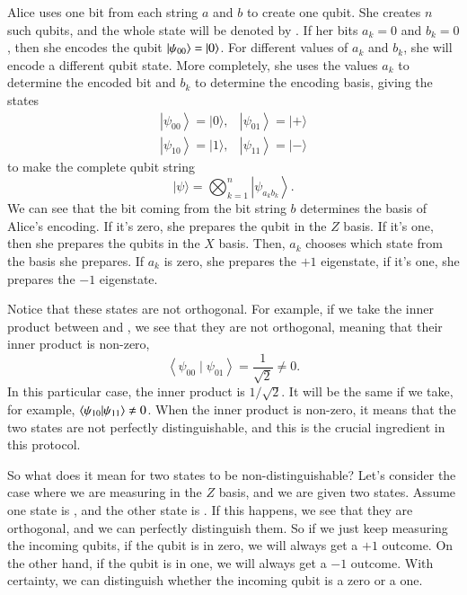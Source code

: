 Alice uses one bit from each string $a$ and $b$ to create one qubit. She creates $n$ such qubits, and the whole state will be denoted by \ket{\psi}. If her bits $a_k = 0$ and $b_k = 0$, then she encodes the qubit $\left| \psi_{00} \right\rangle = \left| 0 \right\rangle$.  For different values of $a_k$ and $b_k$, she will encode a different qubit state.  More completely, she uses the values $a_k$ to determine the encoded bit and $b_k$ to determine the encoding basis, giving the states
\begin{equation}
\begin{array}{ll}
\left|\psi_{00}\right\rangle=|0\rangle, & \left|\psi_{01}\right\rangle=|+\rangle \\
\left|\psi_{10}\right\rangle=|1\rangle, & \left|\psi_{11}\right\rangle=|-\rangle
\end{array}
\end{equation}
to make the complete qubit string
\begin{equation}
|\psi\rangle=\bigotimes_{k=1}^n\left|\psi_{a_k b_k}\right\rangle.
\end{equation}
We can see that the bit coming from the bit string $b$ determines the basis of Alice's encoding. If it's zero, she prepares the qubit in the $Z$ basis. If it's one, then she prepares the qubits in the $X$ basis. Then, $a_k$ chooses which state from the basis she prepares. If $a_k$ is zero, she prepares the $+1$ eigenstate, if it's one, she prepares the $-1$ eigenstate.

Notice that these states are not orthogonal. For example, if we take the inner product between  and , we see that they are not orthogonal, meaning that their inner product is non-zero,
\begin{equation}
\left\langle\psi_{00} \mid \psi_{01}\right\rangle=\frac{1}{\sqrt{2}} \ne 0.
\end{equation}
In this particular case, the inner product is $1/\sqrt{2}$. It will be the same if we take, for example, 
$\langle \psi_{10}|\psi_{11} \rangle \ne 0$. When the inner product is non-zero, it means that the two states are not perfectly distinguishable, and this is the crucial ingredient in this protocol. 

So what does it mean for two states to be non-distinguishable? Let's consider the case where we are measuring in the $Z$ basis, and we are given two states. Assume one state is , and the other state is . If this happens, we see that they are orthogonal, and we can perfectly distinguish them. So if we just keep measuring the incoming qubits, if the qubit is in zero, we will always get a $+1$ outcome. On the other hand, if the qubit is in one, we will always get a $-1$ outcome. With certainty, we can distinguish whether the incoming qubit is a zero or a one.

